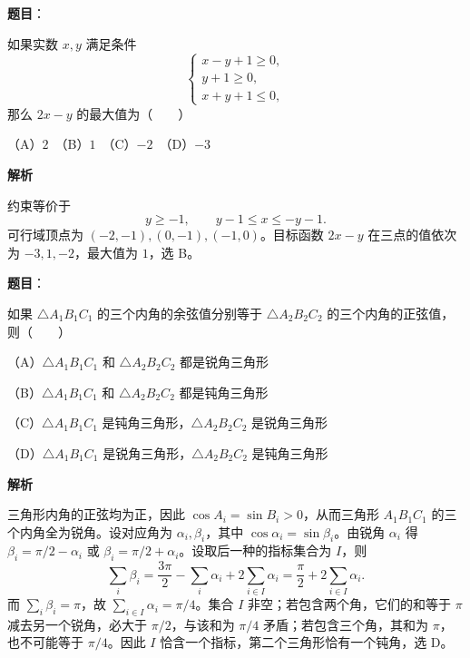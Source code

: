 \begin{answer}

\textbf{题目}：

如果实数 $x,y$ 满足条件
\nopagebreak[4]
\[
\begin{cases}
x-y+1\geqslant0,\\
y+1\geqslant0,\\
x+y+1\leqslant0,
\end{cases}
\]
那么 $2x-y$ 的最大值为\mbox{（　　）}

（A）$2$　（B）$1$　（C）$-2$　（D）$-3$

\textbf{解析}

约束等价于
\nopagebreak[4]
\[
y\ge-1,\qquad y-1\le x\le-y-1.
\]
可行域顶点为 $(-2,-1),(0,-1),(-1,0)$。目标函数 $2x-y$ 在三点的值依次为 $-3,1,-2$，最大值为 $1$，选 B。


\end{answer}
\begin{answer}

\textbf{题目}：

如果 $\triangle A_1B_1C_1$ 的三个内角的余弦值分别等于 $\triangle A_2B_2C_2$ 的三个内角的正弦值，则\mbox{（　　）}

（A）$\triangle A_1B_1C_1$ 和 $\triangle A_2B_2C_2$ 都是锐角三角形

（B）$\triangle A_1B_1C_1$ 和 $\triangle A_2B_2C_2$ 都是钝角三角形

（C）$\triangle A_1B_1C_1$ 是钝角三角形，$\triangle A_2B_2C_2$ 是锐角三角形

（D）$\triangle A_1B_1C_1$ 是锐角三角形，$\triangle A_2B_2C_2$ 是钝角三角形

\textbf{解析}

三角形内角的正弦均为正，因此 $\cos A_i=\sin B_i>0$，从而三角形 $A_1B_1C_1$ 的三个内角全为锐角。设对应角为 $\alpha_i,\beta_i$，其中 $\cos\alpha_i=\sin\beta_i$。由锐角 $\alpha_i$ 得 $\beta_i=\pi/2-\alpha_i$ 或 $\beta_i=\pi/2+\alpha_i$。设取后一种的指标集合为 $I$，则
\nopagebreak[4]
\[
\sum_i\beta_i=\frac{3\pi}{2}-\sum_i\alpha_i+2\sum_{i\in I}\alpha_i
=\frac\pi2+2\sum_{i\in I}\alpha_i.
\]
而 $\sum_i\beta_i=\pi$，故 $\sum_{i\in I}\alpha_i=\pi/4$。集合 $I$ 非空；若包含两个角，它们的和等于 $\pi$ 减去另一个锐角，必大于 $\pi/2$，与该和为 $\pi/4$ 矛盾；若包含三个角，其和为 $\pi$，也不可能等于 $\pi/4$。因此 $I$ 恰含一个指标，第二个三角形恰有一个钝角，选 D。


\end{answer}

